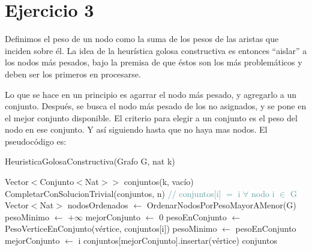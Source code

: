 \section{Ejercicio 3}

Definimos el peso de un nodo como la suma de los pesos de las aristas que inciden sobre él. La idea de la heurística golosa constructiva es entonces ``aislar'' a los nodos más pesados, bajo la premisa de que éstos son los más problemáticos y deben ser los primeros en procesarse.

Lo que se hace en un principio es agarrar el nodo más pesado, y agregarlo a un conjunto. Después, se busca el nodo más pesado de los no asignados, y se pone en el mejor conjunto disponible. El criterio para elegir a un conjunto es el peso del nodo en ese conjunto. Y así siguiendo hasta que no haya mas nodos. El pseudocódigo es:
\begin{algorithm}[H]
\begin{algorithmic}[1]
\caption{HeuristicaGolosaConstructiva(Grafo G, nat k)}
\STATE Vector$<$Conjunto$<$Nat$>>$ conjuntos(k, vacío)
    \STATE CompletarConSolucionTrivial(conjuntos, n) \textcolor{CadetBlue}{// conjuntos$[$i$]$ $=$ i $\forall$ nodo i $\in$ G}
\ELSE
    \STATE Vector$<$Nat$>$ nodosOrdenados $\leftarrow$ OrdenarNodosPorPesoMayorAMenor(G)
        \STATE pesoMinimo $\leftarrow$ $+ \infty$
        \STATE mejorConjunto $\leftarrow$ 0
            \STATE pesoEnConjunto $\leftarrow$ PesoVerticeEnConjunto(vértice, conjuntos$[$i$]$)
                \STATE pesoMinimo $\leftarrow$ pesoEnConjunto
                \STATE mejorConjunto $\leftarrow$ i
            \ENDIF
        \ENDFOR
        \STATE conjuntos$[$mejorConjunto$]$.insertar(vértice)
    \ENDFOR
\ENDIF
\RETURN conjuntos
\end{algorithmic}
\end{algorithm}

